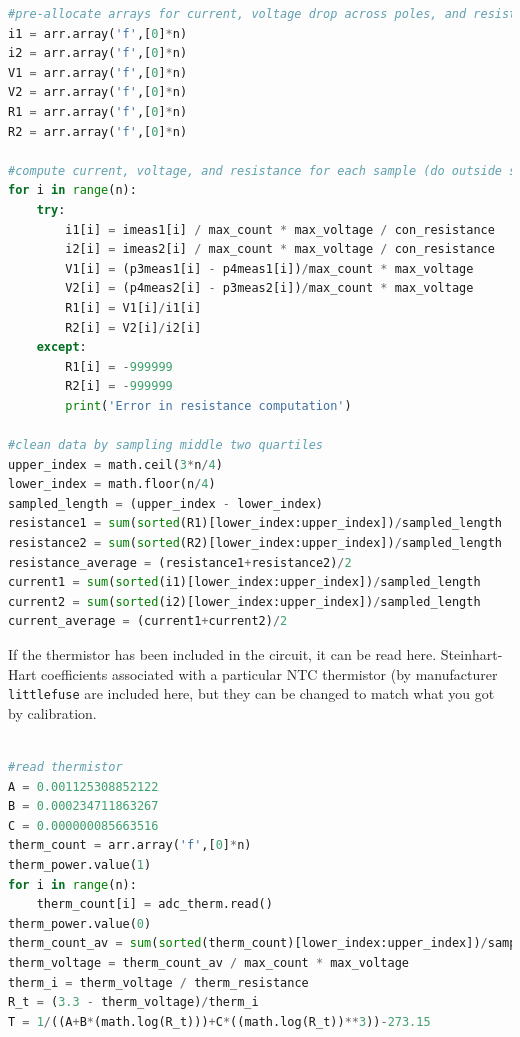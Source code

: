 {\begin{lstlisting}[language=Python]
#pre-allocate arrays for current, voltage drop across poles, and resistance, for flow each direction
i1 = arr.array('f',[0]*n)
i2 = arr.array('f',[0]*n)
V1 = arr.array('f',[0]*n)
V2 = arr.array('f',[0]*n)
R1 = arr.array('f',[0]*n)
R2 = arr.array('f',[0]*n)

#compute current, voltage, and resistance for each sample (do outside sampling loop to maintain sampling timing)
for i in range(n):
    try:
        i1[i] = imeas1[i] / max_count * max_voltage / con_resistance 
        i2[i] = imeas2[i] / max_count * max_voltage / con_resistance 
        V1[i] = (p3meas1[i] - p4meas1[i])/max_count * max_voltage
        V2[i] = (p4meas2[i] - p3meas2[i])/max_count * max_voltage
        R1[i] = V1[i]/i1[i]
        R2[i] = V2[i]/i2[i]
    except:
        R1[i] = -999999
        R2[i] = -999999
        print('Error in resistance computation')

#clean data by sampling middle two quartiles       
upper_index = math.ceil(3*n/4)
lower_index = math.floor(n/4)
sampled_length = (upper_index - lower_index)
resistance1 = sum(sorted(R1)[lower_index:upper_index])/sampled_length
resistance2 = sum(sorted(R2)[lower_index:upper_index])/sampled_length
resistance_average = (resistance1+resistance2)/2
current1 = sum(sorted(i1)[lower_index:upper_index])/sampled_length
current2 = sum(sorted(i2)[lower_index:upper_index])/sampled_length
current_average = (current1+current2)/2

\end{lstlisting}

If the thermistor has been included in the circuit, it can be read here.  Steinhart-Hart coefficients associated with a particular NTC thermistor (by manufacturer \texttt{littlefuse} are included here, but they can be changed to match what you got by calibration.

\begin{lstlisting}[language=Python]

#read thermistor
A = 0.001125308852122
B = 0.000234711863267
C = 0.000000085663516
therm_count = arr.array('f',[0]*n)
therm_power.value(1)
for i in range(n):
    therm_count[i] = adc_therm.read()
therm_power.value(0)
therm_count_av = sum(sorted(therm_count)[lower_index:upper_index])/sampled_length    
therm_voltage = therm_count_av / max_count * max_voltage
therm_i = therm_voltage / therm_resistance
R_t = (3.3 - therm_voltage)/therm_i
T = 1/((A+B*(math.log(R_t)))+C*((math.log(R_t))**3))-273.15


\end{lstlisting}}
